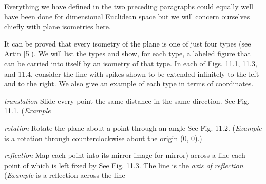 \documentclass[11pt,oneside]{article}
\begin{document}
\begin{BookBody}
Everything we have defined in the two preceding paragraphs could equally well have been done for dimensional Euclidean space  but we will concern ourselves chiefly with plane isometries here.

It can be proved that every isometry of the plane is one of just four types (see Artin [5]). We will list the types and show, for each type, a labeled figure that can be carried into itself by an isometry of that type. In each of Figs. 11.1, 11.3, and 11.4, consider the line with spikes shown to be extended infinitely to the left and to the right. We also give an example of each type in terms of coordinates.

\textit{translation} \BookInline{\tau:} Slide every point the same distance in the same direction. See Fig. 11.1. (\textit{Example}

\textit{rotation} \BookInline{\rho:} Rotate the plane about a point  through an angle  See Fig. 11.2. (\textit{Example} is a rotation through  counterclockwise about the origin (0, 0).)

\textit{reflection} \BookInline{\mu:} Map each point into its mirror image \BookInline{(\mu } for mirror) across a line  each point of which is left fixed by  See Fig. 11.3. The line  is the\textit{ axis of} \textit{reflection}. (\textit{Example} is a reflection across the line 

\end{BookBody}

\BookNarrativetrue
\end{document}
